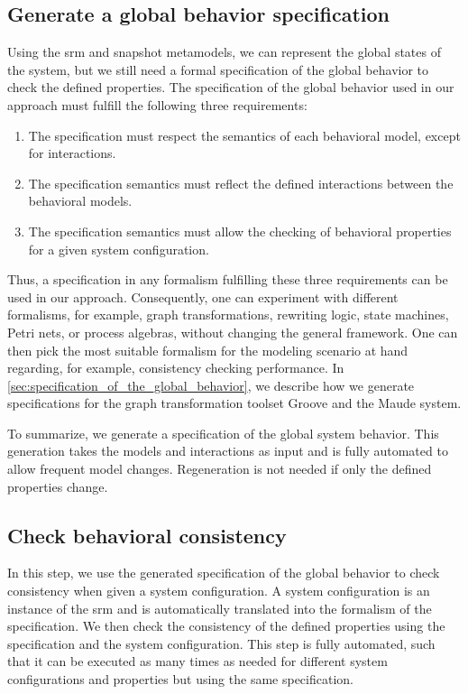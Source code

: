 \documentclass{jot}
\begin{document}
\subsection{Generate a global behavior specification}
Using the \gls*{srm} and snapshot metamodels, we can represent the global states of the system, but we still need a formal specification of the global behavior to check the defined properties.
The specification of the global behavior used in our approach must fulfill the following three requirements:
\begin{enumerate}
    \item The specification must respect the semantics of each behavioral model, except for interactions.
    \item The specification semantics must reflect the defined interactions between the behavioral models.
    \item The specification semantics must allow the checking of behavioral properties for a given system configuration.
\end{enumerate}
Thus, a specification in any formalism fulfilling these three requirements can be used in our approach.
Consequently, one can experiment with different formalisms, for example, graph transformations, rewriting logic, state machines, Petri nets, or process algebras, without changing the general framework.
One can then pick the most suitable formalism for the modeling scenario at hand regarding, for example, consistency checking performance.
In \cref{sec:specification_of_the_global_behavior}, we describe how we generate specifications for the graph transformation toolset Groove and the Maude system.

To summarize, we generate a specification of the global system behavior.
This generation takes the models and interactions as input and is fully automated to allow frequent model changes.
Regeneration is not needed if only the defined properties change.


\subsection{Check behavioral consistency}
In this step, we use the generated specification of the global behavior to check consistency when given a system configuration.
A system configuration is an instance of the \gls*{srm} and is automatically translated into the formalism of the specification.
We then check the consistency of the defined properties using the specification and the system configuration.
This step is fully automated, such that it can be executed as many times as needed for different system configurations and properties but using the same specification.
\end{document}
